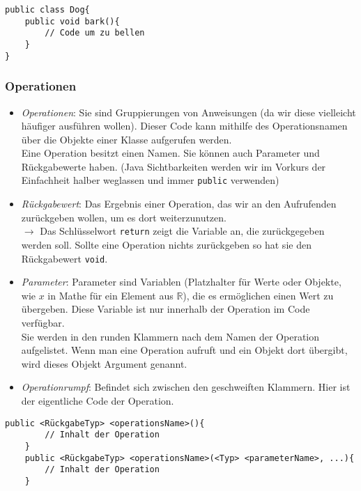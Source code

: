 \begin{lstlisting}[title=\textbf{Beispiel: Klasse}]
public class Dog{
	public void bark(){
		// Code um zu bellen
	}
}
\end{lstlisting}
\begin{Infobox}
	\subsubsection*{Operationen}
	\begin{itemize}
		\item \textit{Operationen}: Sie sind Gruppierungen von Anweisungen (da wir diese vielleicht häufiger ausführen wollen).
		Dieser Code kann mithilfe des Operationsnamen über die Objekte einer Klasse aufgerufen werden.\\
		Eine Operation besitzt einen Namen. Sie können auch Parameter und Rückgabewerte haben. (Java Sichtbarkeiten werden wir im Vorkurs der Einfachheit halber weglassen und immer \lstinline{public} verwenden)
		\item \textit{Rückgabewert}: Das Ergebnis einer Operation, das wir an den Aufrufenden zurückgeben wollen, um es dort weiterzunutzen.\\
		$\rightarrow$ Das Schlüsselwort \lstinline{return} zeigt die Variable an, die zurückgegeben werden soll.
		Sollte eine Operation nichts zurückgeben so hat sie den Rückgabewert \lstinline{void}.
		\item \textit{Parameter}: Parameter sind Variablen (Platzhalter für Werte oder Objekte, wie $x$ in Mathe für ein Element aus $\mathbb{R}$), die es ermöglichen einen Wert zu übergeben. Diese Variable ist nur innerhalb der Operation im Code verfügbar.\\
			Sie werden in den runden Klammern nach dem Namen der Operation aufgelistet.
			Wenn man eine Operation aufruft und ein Objekt dort übergibt, wird dieses Objekt Argument genannt.
		\item \textit{Operationrumpf}: Befindet sich zwischen den geschweiften Klammern. Hier ist der eigentliche Code der Operation.
	\end{itemize}

\end{Infobox}

\begin{lstlisting}[title=\textbf{Operationen Syntax}]
	public <RückgabeTyp> <operationsName>(){
		// Inhalt der Operation
	}
	public <RückgabeTyp> <operationsName>(<Typ> <parameterName>, ...){
		// Inhalt der Operation
	}
\end{lstlisting}

